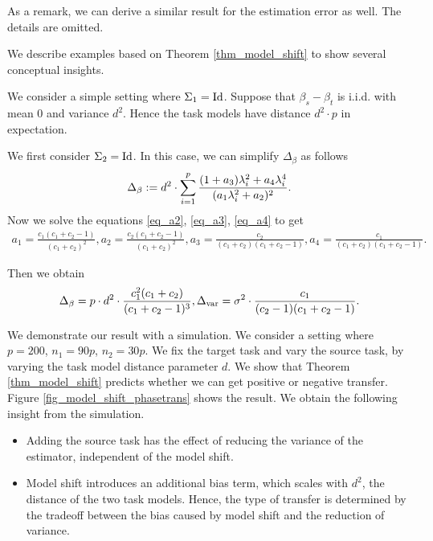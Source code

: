 As a remark, we can derive a similar result for the estimation error as well. The details are omitted.


We describe examples based on Theorem \ref{thm_model_shift} to show several conceptual insights.

\begin{example}
	We consider a simple setting where $\Sigma_1 = \operatorname{Id}$.
	Suppose that $\beta_s - \beta_t$ is i.i.d. with mean $0$ and variance $d^2$. Hence the task models have distance $d^2\cdot p$ in expectation.


	We first consider $\Sigma_2 = \operatorname{Id}$. In this case, we can simplify $\Delta_{\beta}$ as follows
	\begin{align} \label{eq_delta_simple}
		\Delta_{\beta} := d^2 \cdot \sum_{i=1}^p \frac{(1 + a_3)\lambda_i^2 + a_4 \lambda_i^4}{(a_1 \lambda_i^2 + a_2)^2}.
	\end{align}
	Now we solve the equations \eqref{eq_a2}, \eqref{eq_a3}, \eqref{eq_a4} to get
	\begin{align}
		a_1 = \frac{c_1(c_1 + c_2 - 1)}{(c_1 + c_2)^2},
		a_2 = \frac{c_2(c_1 + c_2 - 1)}{(c_1 + c_2)^2},
		a_3 = \frac{c_2}{(c_1 + c_2)(c_1 + c_2 - 1)},
		a_4 = \frac{c_1}{(c_1 + c_2)(c_1 + c_2 - 1)}.
	\end{align}

	Then we obtain
	\begin{align}
		\Delta_{\beta} = p \cdot d^2 \cdot \frac{c_1^2 (c_1 + c_2)}{(c_1 + c_2 - 1)^3},
		\Delta_{\text{var}} = \sigma^2 \cdot \frac{c_1}{(c_2 - 1)(c_1 + c_2 - 1)}.
	\end{align}

	We demonstrate our result with a simulation.
	We consider a setting where $p = 200$, $n_1 = 90p$, $n_2 = 30p$.
	We fix the target task and vary the source task, by varying the task model distance parameter $d$.
	We show that Theorem \ref{thm_model_shift} predicts whether we can get positive or negative transfer.
	Figure \ref{fig_model_shift_phasetrans} shows the result.
	We obtain the following insight from the simulation.
	\begin{itemize}
		\item Adding the source task has the effect of reducing the variance of the estimator, independent of the model shift.
		\item Model shift introduces an additional bias term, which scales with $d^2$, the distance of the two task models.
		Hence, the type of transfer is determined by the tradeoff between the bias caused by model shift and the reduction of variance.
	\end{itemize}
\end{example}


